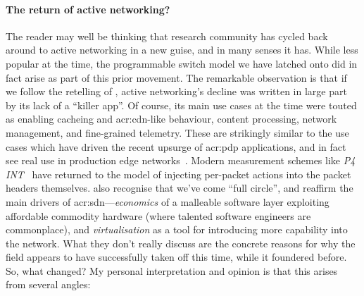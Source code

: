 \paragraph{The return of active networking?}
The reader may well be thinking that research community has cycled back around to active networking in a new guise, and in many senses it has.
While less popular at the time, the programmable switch model we have latched onto did in fact arise as part of this prior movement.
The remarkable observation is that if we follow the retelling of \Textcite{DBLP:journals/ccr/FeamsterRZ14}, active networking's decline was written in large part by its lack of a ``killer app''.
Of course, its main use cases at the time were touted as enabling cacheing and \gls{acr:cdn}-like behaviour, content processing, network management, and fine-grained telemetry.
These are strikingly similar to the use cases which have driven the recent upsurge of \gls{acr:pdp} applications, and in fact see real use in production edge networks~\parencite{DBLP:conf/sigcomm/TianGLZCZDYMTLW21}.
Modern measurement schemes like \emph{P4 INT}~\parencite{p4-int} have returned to the model of injecting per-packet actions into the packet headers themselves.
\Textcite{DBLP:journals/ccr/WetherallT19} also recognise that we've come ``full circle'', and reaffirm the main drivers of \gls{acr:sdn}---\emph{economics} of a malleable software layer exploiting affordable commodity hardware (where talented software engineers are commonplace), and \emph{virtualisation} as a tool for introducing more capability into the network.
What they don't really discuss are the concrete reasons for why the field appears to have successfully taken off this time, while it foundered before.
So, what changed?
My personal interpretation and opinion is that this arises from several angles: 
